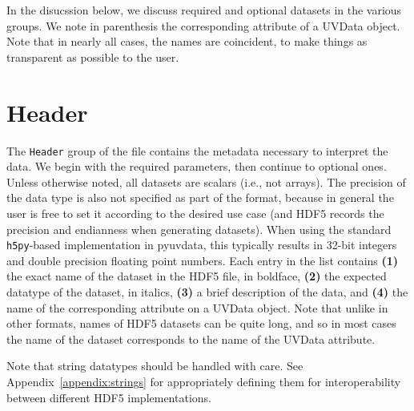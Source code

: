 \documentclass[11pt, oneside]{article}
\begin{document}
In the disucssion below, we discuss required and optional datasets in the
various groups. We note in parenthesis the corresponding attribute of a UVData
object. Note that in nearly all cases, the names are coincident, to make things
as transparent as possible to the user.

\section{Header}
\label{sec:header}
The \verb+Header+ group of the file contains the metadata necessary to interpret
the data. We begin with the required parameters, then continue to optional
ones. Unless otherwise noted, all datasets are scalars (i.e., not arrays). The
precision of the data type is also not specified as part of the format, because
in general the user is free to set it according to the desired use case (and
HDF5 records the precision and endianness when generating datasets). When using
the standard \verb+h5py+-based implementation in pyuvdata, this typically
results in 32-bit integers and double precision floating point numbers. Each
entry in the list contains \textbf{(1)} the exact name of the dataset in the
HDF5 file, in boldface, \textbf{(2)} the expected datatype of the dataset, in
italics, \textbf{(3)} a brief description of the data, and \textbf{(4)} the name
of the corresponding attribute on a UVData object. Note that unlike in other
formats, names of HDF5 datasets can be quite long, and so in most cases the name
of the dataset corresponds to the name of the UVData attribute.

Note that string datatypes should be handled with care. See
Appendix~\ref{appendix:strings} for appropriately defining them for
interoperability between different HDF5 implementations.
\end{document}
